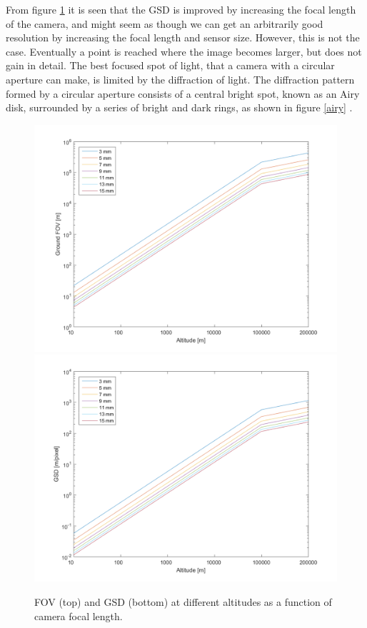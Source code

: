 From figure \ref{cameramatlab} it is seen that the GSD is improved by increasing the focal length of the camera, and might seem as though we can get an arbitrarily good resolution by increasing the focal length and sensor size. However, this is not the case. Eventually a point is reached where the image becomes larger, but does not gain in detail. The best focused spot of light, that a camera with a circular aperture can make, is limited by the diffraction of light. The diffraction pattern formed by a circular aperture consists of a central bright spot, known as an Airy disk, surrounded by a series of bright and dark rings, as shown in figure \ref{airy} \cite{uniphys}.

\begin{figure}[htb]
\begin{center}
\includegraphics[width=\textwidth]{figures/navtheory/FOV} 
\includegraphics[width=\textwidth]{figures/navtheory/GSD}
\caption{FOV (top) and GSD (bottom) at different altitudes as a function of  camera focal length. }
\label{cameramatlab}
\end{center}
\end{figure}



